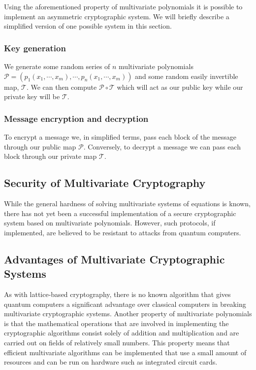 \documentclass[journal]{IEEEtran}
\begin{document}
Using the aforementioned property of multivariate polynomials it is possible to implement an asymmetric cryptographic system. We will briefly describe a simplified version of one possible system in this section.

\subsubsection{Key generation}

We generate some random series of $n$ multivariate polynomials $\mathcal{P} = (p_1(x_1, \cdots, x_m), \cdots, p_n(x_1, \cdots, x_m))$ and some random easily invertible map, $\mathcal{T}$. We can then compute $\mathcal{P} \circ \mathcal{T}$ which will act as our public key while our private key will be $\mathcal{T}$.

\subsubsection{Message encryption and decryption}

To encrypt a message we, in simplified terms, pass each block of the message through our public map $\mathcal{P}$. Conversely, to decrypt a message we can pass each block through our private map $\mathcal{T}$.

\subsection{Security of Multivariate Cryptography}

While the general hardness of solving multivariate systems of equations is known, there has not yet been a successful implementation of a secure cryptographic system based on multivariate polynomials. However, such protocols, if implemented, are believed to be resistant to attacks from quantum computers.

\subsection{Advantages of Multivariate Cryptographic Systems}

As with lattice-based cryptography, there is no known algorithm that gives quantum computers a significant advantage over classical computers in breaking multivariate cryptographic systems. Another property of multivariate polynomials is that the mathematical operations that are involved in implementing the cryptographic algorithms consist solely of addition and multiplication and are carried out on fields of relatively small numbers. This property means that efficient multivariate algorithms can be implemented that use a small amount of resources and can be run on hardware such as integrated circuit cards.
\end{document}
